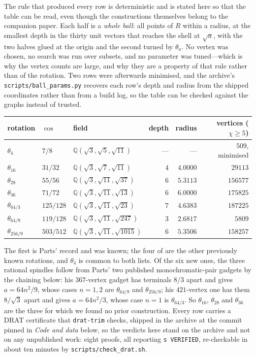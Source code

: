 \documentclass[11pt,reqno]{amsart}
\theoremstyle{plain}
\theoremstyle{definition}
\newcommand{\Q}{\mathbb{Q}}
\newcommand{\Lat}{R}
\begin{document}
The rule that produced every row is deterministic and is stated here so that the
table can be read, even though the constructions themselves belong to the
companion paper. Each half is a \emph{whole ball}: all points of $\Lat$ within a
radius, at the smallest depth in the thirty unit vectors that reaches the shell
at $\sqrt a$, with the two halves glued at the origin and the second turned by
$\theta_a$. No vertex was chosen, no search was run over subsets, and no
parameter was tuned---which is why the vertex counts are large, and why they are
a property of that rule rather than of the rotation. Two rows were afterwards
minimised, and the archive's \texttt{scripts/ball\_params.py} recovers each
row's depth and radius from the shipped coordinates rather than from a build
log, so the table can be checked against the graphs instead of trusted.

\begin{center}
\begin{tabular}{lllrrr}
\hline
rotation & $\cos$ & field & depth & radius & vertices ($\chi \ge 5$) \\
\hline
$\theta_4$ & $7/8$ & $\Q(\sqrt3,\sqrt5,\sqrt{11})$ & --- & --- & $509$, minimised \\
$\theta_{16}$ & $31/32$ & $\Q(\sqrt3,\sqrt7,\sqrt{11})$ & $4$ & $4.0000$ & $29113$ \\
$\theta_{28}$ & $55/56$ & $\Q(\sqrt3,\sqrt{11},\sqrt{37})$ & $6$ & $5.3113$ & $156577$ \\
$\theta_{36}$ & $71/72$ & $\Q(\sqrt3,\sqrt{11},\sqrt{13})$ & $6$ & $6.0000$ & $175825$ \\
$\theta_{64/3}$ & $125/128$ & $\Q(\sqrt3,\sqrt{11},\sqrt{23})$ & $7$ & $4.6383$ & $187225$ \\
$\theta_{64/9}$ & $119/128$ & $\Q(\sqrt3,\sqrt{11},\sqrt{247})$ & $3$ & $2.6817$ & $5809$ \\
$\theta_{256/9}$ & $503/512$ & $\Q(\sqrt3,\sqrt{11},\sqrt{1015})$ & $6$ & $5.3506$ & $158257$ \\
\hline
\end{tabular}
\end{center}

The first is Parts' record and was known; the four of \cite{Voronov} are the
other previously known rotations, and $\theta_4$ is common to both lists. Of the
six new ones, the three rational spindles follow from Parts' two published
monochromatic-pair gadgets by the chaining below: his $367$-vertex gadget has
terminals $8/3$ apart and gives $a = 64n^2/9$, whose cases $n = 1, 2$ are
$\theta_{64/9}$ and $\theta_{256/9}$; his $421$-vertex one has them $8/\sqrt3$
apart and gives $a = 64n^2/3$, whose case $n = 1$ is $\theta_{64/3}$. So
$\theta_{16}$, $\theta_{28}$ and $\theta_{36}$ are the three for which we found
no prior construction. Every row carries a DRAT certificate that \texttt{drat-trim}
checks, shipped in the archive at the commit pinned in \emph{Code and data}
below, so the verdicts here stand on the archive and not on any unpublished
work: eight proofs, all
reporting \texttt{s VERIFIED}, re-checkable in about ten minutes by
\texttt{scripts/check\_drat.sh}.
\end{document}
